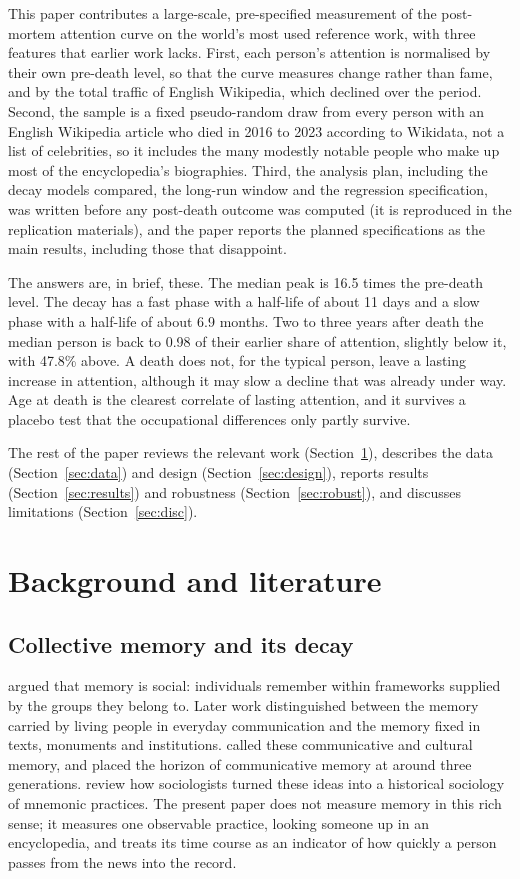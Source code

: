 \documentclass[11pt,a4paper]{article}
\begin{document}
This paper contributes a large-scale, pre-specified measurement of the post-mortem attention curve on the world's most used reference work, with three features that earlier work lacks. First, each person's attention is normalised by their own pre-death level, so that the curve measures change rather than fame, and by the total traffic of English Wikipedia, which declined over the period. Second, the sample is a fixed pseudo-random draw from every person with an English Wikipedia article who died in 2016 to 2023 according to Wikidata, not a list of celebrities, so it includes the many modestly notable people who make up most of the encyclopedia's biographies. Third, the analysis plan, including the decay models compared, the long-run window and the regression specification, was written before any post-death outcome was computed (it is reproduced in the replication materials), and the paper reports the planned specifications as the main results, including those that disappoint.

The answers are, in brief, these. The median peak is 16.5 times the pre-death level. The decay has a fast phase with a half-life of about 11 days and a slow phase with a half-life of about 6.9 months. Two to three years after death the median person is back to 0.98 of their earlier share of attention, slightly below it, with 47.8\% above. A death does not, for the typical person, leave a lasting increase in attention, although it may slow a decline that was already under way. Age at death is the clearest correlate of lasting attention, and it survives a placebo test that the occupational differences only partly survive.

The rest of the paper reviews the relevant work (Section~\ref{sec:lit}), describes the data (Section~\ref{sec:data}) and design (Section~\ref{sec:design}), reports results (Section~\ref{sec:results}) and robustness (Section~\ref{sec:robust}), and discusses limitations (Section~\ref{sec:disc}).

\section{Background and literature}\label{sec:lit}
\subsection{Collective memory and its decay}
\citet{halbwachs1992} argued that memory is social: individuals remember within frameworks supplied by the groups they belong to. Later work distinguished between the memory carried by living people in everyday communication and the memory fixed in texts, monuments and institutions. \citet{assmann1995} called these communicative and cultural memory, and placed the horizon of communicative memory at around three generations. \citet{olick1998} review how sociologists turned these ideas into a historical sociology of mnemonic practices. The present paper does not measure memory in this rich sense; it measures one observable practice, looking someone up in an encyclopedia, and treats its time course as an indicator of how quickly a person passes from the news into the record.
\end{document}
